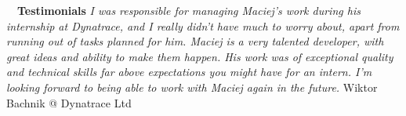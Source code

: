 \documentclass[a4paper, 11pt]{article}
\newcommand{\sectitle}[2]{\large{#1} \ \ \Large{\textbf{#2}}}
\begin{document}
	\begin{section}{\sectitle{\faFile}{Testimonials}}
		\small{\textit{I was responsible for managing Maciej's work during his internship at Dynatrace, and I really didn't have much to worry about, apart from running out of tasks planned for him. Maciej is a very talented developer, with great ideas and ability to make them happen. His work was of exceptional quality and technical skills far above expectations you might have for an intern. I'm looking forward to being able to work with Maciej again in the future.} \hfill{Wiktor Bachnik @ Dynatrace Ltd}}
	\end{section}
\end{document}
